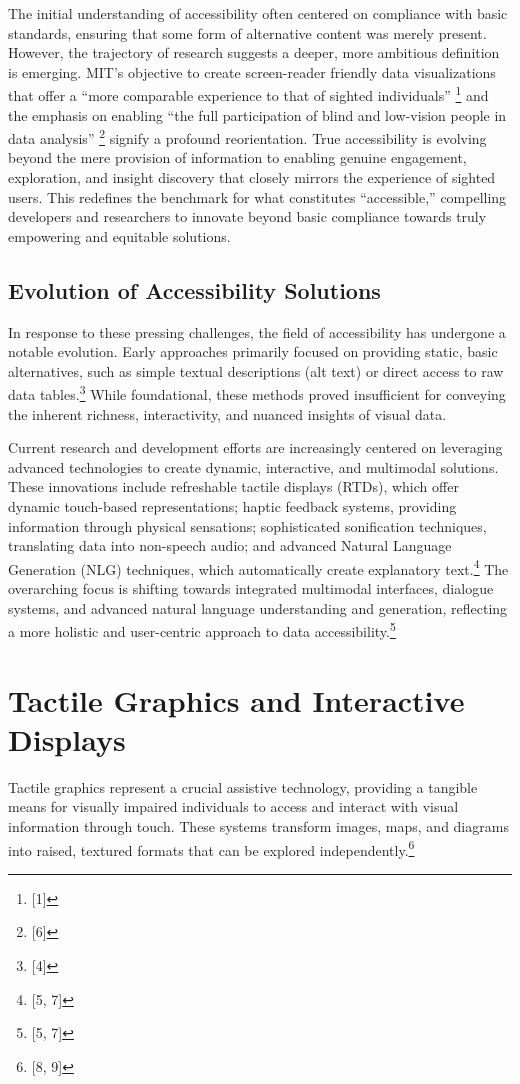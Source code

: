 The initial understanding of accessibility often centered on compliance with basic standards, ensuring that some form of alternative content was merely present. However, the trajectory of research suggests a deeper, more ambitious definition is emerging. MIT's objective to create screen-reader friendly data visualizations that offer a ``more comparable experience to that of sighted individuals'' \footnote{[1]} and the emphasis on enabling ``the full participation of blind and low-vision people in data analysis'' \footnote{[6]} signify a profound reorientation. True accessibility is evolving beyond the mere provision of information to enabling genuine engagement, exploration, and insight discovery that closely mirrors the experience of sighted users. This redefines the benchmark for what constitutes ``accessible,'' compelling developers and researchers to innovate beyond basic compliance towards truly empowering and equitable solutions.

\subsection{Evolution of Accessibility Solutions}
In response to these pressing challenges, the field of accessibility has undergone a notable evolution. Early approaches primarily focused on providing static, basic alternatives, such as simple textual descriptions (alt text) or direct access to raw data tables.\footnote{[4]} While foundational, these methods proved insufficient for conveying the inherent richness, interactivity, and nuanced insights of visual data.

Current research and development efforts are increasingly centered on leveraging advanced technologies to create dynamic, interactive, and multimodal solutions. These innovations include refreshable tactile displays (RTDs), which offer dynamic touch-based representations; haptic feedback systems, providing information through physical sensations; sophisticated sonification techniques, translating data into non-speech audio; and advanced Natural Language Generation (NLG) techniques, which automatically create explanatory text.\footnote{[5, 7]} The overarching focus is shifting towards integrated multimodal interfaces, dialogue systems, and advanced natural language understanding and generation, reflecting a more holistic and user-centric approach to data accessibility.\footnote{[5, 7]}

\section{Tactile Graphics and Interactive Displays}
Tactile graphics represent a crucial assistive technology, providing a tangible means for visually impaired individuals to access and interact with visual information through touch. These systems transform images, maps, and diagrams into raised, textured formats that can be explored independently.\footnote{[8, 9]}

